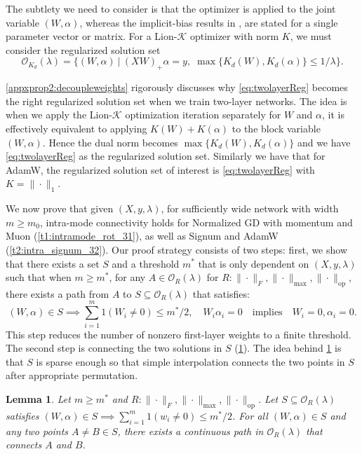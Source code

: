 \documentclass{article}
\newtheorem{lemma}{Lemma}[section]
\newcommand{\op}{\mathrm{op}}
\begin{document}
The subtlety we need to consider is that the optimizer is applied to the joint variable \((W,\alpha)\), whereas the implicit-bias results in \cite{xie2024implicitbiasadamwellinfty}, \cite{chen2025muonoptimizesspectralnorm} are stated for a single parameter vector or matrix. For a Lion-$\mathcal{K}$ optimizer with norm $K$, we must consider the regularized solution set 
\begin{equation}
\label{eq:twolayerReg}
\mathcal{O}_{K_d}(\lambda)
=
\{
(W,\alpha) \ | \
(XW)_+\alpha = y,\;
\max\{K_d(W),K_d(\alpha)\}\le 1/\lambda\}. 
\end{equation}

\cref{appxprop2:decoupleweights} rigorously discusses why \cref{eq:twolayerReg} becomes the right regularized solution set when we train two-layer networks. The idea is when we apply the Lion-$\mathcal K$ optimization iteration separately for $W$ and $\alpha$, it is effectively equivalent to applying $K(W)+K(\alpha)$ to the block variable $(W,\alpha)$. Hence the dual norm becomes $\max \{K_d(W), K_d(\alpha)\}$ and we have \cref{eq:twolayerReg} as the regularized solution set. Similarly we have that for AdamW, the regularized solution set of interest is \cref{eq:twolayerReg} with $K = \|\cdot\|_1$.

We now prove that given $(X, y, \lambda)$, for sufficiently wide network with width $m \geq m_0$, intra-mode connectivity holds for Normalized GD with momentum and Muon (\cref{t1:intramode_rot_31}), as well as Signum and AdamW (\cref{t2:intra_signum_32}). Our proof strategy consists of two steps: first, we show that there exists a set $S$ and a threshold $m^*$ that is only dependent on $(X, y, \lambda)$ such that when $m \ge m^*$, for any $A \in \mathcal{O}_R(\lambda)$ for $R: \|\cdot\|_F, \|\cdot\|_{\max}, \|\cdot\|_{\op}$, there exists a path from $A$ to $S \subseteq \mathcal{O}_R(\lambda)$ that satisfies:
\[ (W, \alpha) \in S \implies \sum_{i=1}^m 1(W_i \neq 0) \le m^*/2, \quad W_i \alpha_i = 0 \quad \textrm{implies} \quad W_i = 0, \alpha_i = 0. \]
This step reduces the number of nonzero first-layer weights to a finite threshold. The second step is connecting the two solutions in $S$ (\cref{Lemma1:smaller}). The idea behind \cref{Lemma1:smaller} is that $S$ is sparse enough so that simple interpolation connects the two points in $S$ after appropriate permutation. 

\begin{lemma}
\label{Lemma1:smaller}
Let $m \ge m^*$ and $R: \|\cdot\|_F, \|\cdot\|_{\max}, \|\cdot\|_{\op}$. Let $S \subseteq \mathcal{O}_R(\lambda)$ satisfies $(W, \alpha) \in S \implies \sum_{i=1}^m 1(w_i \neq 0) \le m^*/2$. For all $(W, \alpha) \in S$ and any two points $A \ne B \in S$, there exists a continuous path in $\mathcal{O}_R(\lambda)$ that connects $A$ and $B$. 
\end{lemma}
\end{document}
